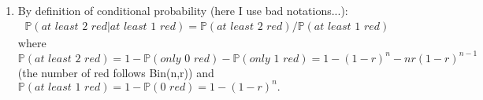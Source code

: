 \begin{exercise} [BH.4.57]
\begin{solution}
\begin{enumerate}
\begin{align*}
        	\mathbb{P}\left(I_1=1 \right) =1-	\mathbb{P}\left(I_1=0 \right) = (1-b-r)/(1-b) = g/(g+r) 
        \end{align*}
        \item %
        By definition of conditional probability (here I use bad notations...):
        \begin{align*}
        	\mathbb{P}(\textit{at least 2 red}| \textit{at least 1 red})=	\mathbb{P}(\textit{at least 2 red})/ \mathbb{P} (\textit{at least 1 red})
        \end{align*}
        where $\mathbb{P}(\textit{at least 2 red}) = 1-\mathbb{P}(\textit{only 0 red})-\mathbb{P}(\textit{only 1 red})=1-(1-r)^n -nr(1-r)^{n-1}$ (the number of red follows Bin(n,r)) and $\mathbb{P} (\textit{at least 1 red})=1- \mathbb{P} (\textit{0 red})=1-(1-r)^n.$ 
	\end{enumerate}
\end{solution}
\end{exercise}

